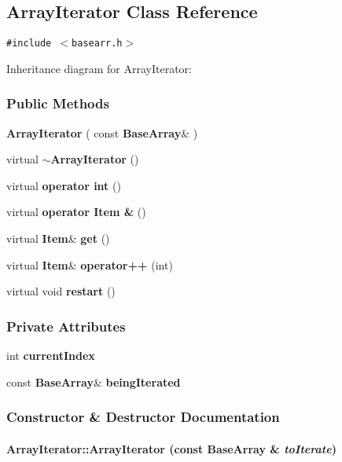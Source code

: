 \subsection{Array\-Iterator  Class Reference}
\label{ArrayIterator}
{\tt \#include $<$basearr.h$>$}

Inheritance diagram for Array\-Iterator:\begin{figure}[H]
\begin{center}
\leavevmode
\setlength{\epsfysize}{2cm}
\end{center}
\end{figure}
\subsubsection*{Public Methods}
\begin{CompactItemize}
\item 
{\bf Array\-Iterator} ( const {\bf Base\-Array}\& )
\item 
virtual {\bf $\sim$Array\-Iterator} ()
\item 
virtual {\bf operator int} ()
\item 
virtual {\bf operator Item \&} ()
\item 
virtual {\bf Item}\& {\bf get} ()
\item 
virtual {\bf Item}\& {\bf operator++} (int)
\item 
virtual void {\bf restart} ()
\end{CompactItemize}
\subsubsection*{Private Attributes}
\begin{CompactItemize}
\item 
int {\bf current\-Index}
\item 
const {\bf Base\-Array}\& {\bf being\-Iterated}
\end{CompactItemize}


\subsubsection{Constructor \& Destructor Documentation}
\label{ArrayIterator_a0}
\paragraph{\setlength{\rightskip}{0pt plus 5cm}Array\-Iterator::Array\-Iterator (const {\bf Base\-Array} \& {\em to\-Iterate})\hspace{0.3cm}{\tt  [inline]}}\hfill




